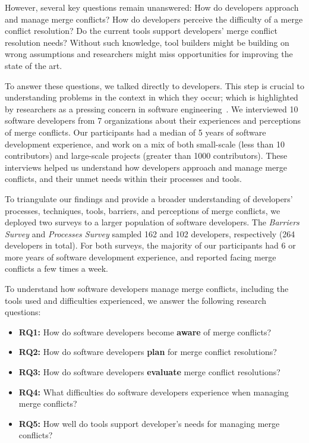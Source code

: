 However, several key questions remain unanswered: 
How do developers approach and manage merge conflicts?
How do developers perceive the difficulty of a merge conflict resolution? 
Do the current tools support developers' merge conflict resolution needs?
Without such knowledge, tool builders might be building on wrong assumptions and researchers might miss opportunities for improving the state of the art.

To answer these questions, we talked directly to developers.
This step is crucial to understanding problems in the context in which they occur; which is highlighted by researchers as a pressing concern in software engineering~\cite{fritz2010using, sillito2006questions, ko2007information}.
We interviewed 10 software developers from 7 organizations about their experiences and perceptions of merge conflicts. %
Our participants had a median of 5 years of software development experience, and work on a mix of both small-scale (less than 10 contributors) and large-scale projects (greater than 1000 contributors).
These interviews helped us understand how developers approach and manage merge conflicts, and their unmet needs within their processes and tools.

To triangulate our findings and provide a broader understanding of developers' processes, techniques, tools, barriers, and perceptions of merge conflicts, we deployed two surveys to a larger population of software developers.
The \textit{Barriers Survey} and \textit{Processes Survey} sampled 162 and 102 developers, respectively (264 developers in total).
For both surveys, the majority of our participants had 6 or more years of software development experience, and reported facing merge conflicts a few times a week.

To understand how software developers manage merge conflicts, including the tools used and difficulties experienced, we answer the following research questions:

\begin{itemize}[label=$\bullet$]
\item \textbf{RQ1:} How do software developers become \textbf{aware} of merge conflicts?
\item \textbf{RQ2:} How do software developers \textbf{plan} for merge conflict resolutions?
\item \textbf{RQ3:} How do software developers \textbf{evaluate} merge conflict resolutions?
\item \textbf{RQ4:} What difficulties do software developers experience when managing merge conflicts?
\item \textbf{RQ5:} How well do tools support developer's needs for managing merge conflicts?
\end{itemize}

